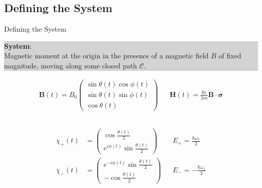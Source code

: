 \documentclass[9pt]{beamer}
\begin{document}
\subsection{Defining the System}
\begin{frame}{Defining the System}
 
  \colorbox{lightgray}{
    \parbox{\textwidth}{
      \textbf{System}:\\ Magnetic moment at the origin in the presence of a magnetic field
                       $B$ of fixed magnitude, moving along some closed path 
                       $\mathcal{C}$.
    }
  }

      \begin{align*}
        \bm{B}(t) = B_{0} \begin{pmatrix} 
                                          \sin\theta(t)\cos\phi(t)\\
                                          \sin\theta(t)\sin\phi(t)\\
                                          \cos\theta(t)
                           \end{pmatrix}
        && \bm{H}(t) = \frac{\hbar e}{2m}\bm{B} \cdot \bm{\sigma}
      \end{align*}

  \begin{columns}

    \begin{column}{0.6\textwidth}


      \begin{align*}
        \chi_{+}(t) &= \begin{pmatrix} 
                                      \cos\frac{\theta(t)}{2}\\
                                      e^{i\phi(t)} \sin \frac{\theta(t)}{2}
                       \end{pmatrix} 
                       && E_{+} = \frac{\hbar \omega_{1}}{2}\\
       \chi_{-}(t) &= \begin{pmatrix} 
                                     e^{-i\phi(t)}\sin\frac{\theta(t)}{2}\\
                                     -\cos\frac{\theta(t)}{2}
                       \end{pmatrix} 
                       && E_{-} = -\frac{\hbar \omega_{1}}{2}
      \end{align*}
    \end{column}


\end{columns}
\end{frame}
\end{document}
